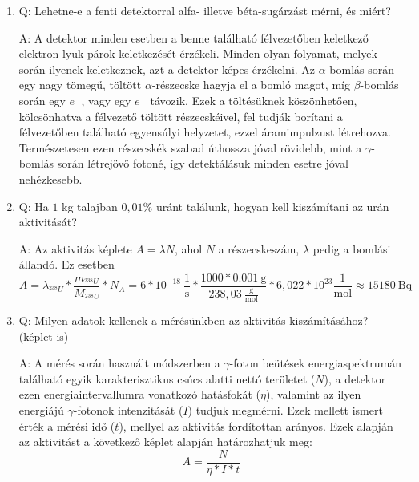 \begin{enumerate}
    \item Q: Lehetne-e a fenti detektorral alfa- illetve béta-sugárzást mérni, és miért?
    \begin{displayquote}
        A: A detektor minden esetben a benne található félvezetőben keletkező elektron-lyuk párok keletkezését érzékeli. Minden olyan folyamat, melyek során ilyenek keletkeznek, azt a detektor képes érzékelni. Az $\alpha$-bomlás során egy nagy tömegű, töltött $\alpha$-részecske hagyja el a bomló magot, míg $\beta$-bomlás során egy $e^{-}$, vagy egy $e^{+}$ távozik. Ezek a töltésüknek köszönhetően, kölcsönhatva a félvezető töltött részecskéivel, fel tudják borítani a félvezetőben található egyensúlyi helyzetet, ezzel áramimpulzust létrehozva. Természetesen ezen részecskék szabad úthossza jóval rövidebb, mint a $\gamma$-bomlás során létrejövő fotoné, így detektálásuk minden esetre jóval nehézkesebb.
    \end{displayquote}
    
    \item Q: Ha $1$ kg talajban $0,01$\% uránt találunk, hogyan kell kiszámítani az urán aktivitását?
    \begin{displayquote}
        A: Az aktivitás képlete $A = \lambda N$, ahol $N$ a részecskeszám, $\lambda$ pedig a bomlási állandó. Ez esetben
        \begin{equation}
            A
            =
            \lambda_{^{238}U}
            *
            \frac{m_{^{238}U}}{M_{^{238}U}}
            *
            N_{A}
            =
            6 * 10^{-18}\ \frac{1}{\text{s}}
            *
            \frac{1000 * 0.001\ \text{g}}{238,03\ \frac{\text{g}}{\text{mol}}}
            *
            6,022 * 10^{23} \frac{1}{\text{mol}}
            \approx
            15180\ \text{Bq}
        \end{equation}
    \end{displayquote}
    
    \item Q: Milyen adatok kellenek a mérésünkben az aktivitás kiszámításához? (képlet is)
    \begin{displayquote}
        A: A mérés során használt módszerben a $\gamma$-foton beütések energiaspektrumán található egyik karakterisztikus csúcs alatti nettó területet ($N$), a detektor ezen energiaintervallumra vonatkozó hatásfokát ($\eta$), valamint az ilyen energiájú $\gamma$-fotonok intenzitását ($I$) tudjuk megmérni. Ezek mellett ismert érték a mérési idő ($t$), mellyel az aktivitás fordítottan arányos. Ezek alapján az aktivitást a következő képlet alapján határozhatjuk meg:
        \begin{equation}
            A
            =
            \frac{N}{\eta * I * t}
        \end{equation}
    \end{displayquote}
    

\end{enumerate}
